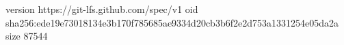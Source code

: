 version https://git-lfs.github.com/spec/v1
oid sha256:ede19e73018134e3b170f785685ae9334d20cb3b6f2e2d753a1331254e05da2a
size 87544
